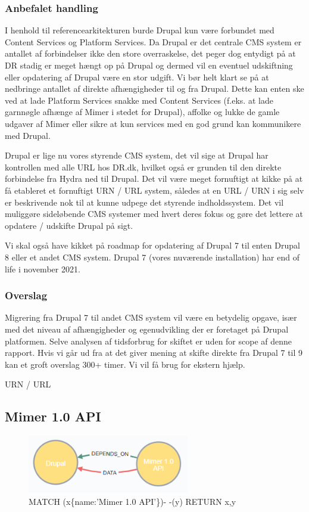 \documentclass{article}
\begin{document}
\subsubsection{Anbefalet handling}
I henhold til referencearkitekturen burde Drupal kun være forbundet med Content Services og Platform Services. Da Drupal er det centrale CMS system er antallet af forbindelser ikke den store overraskelse, det peger dog entydigt på at DR stadig er meget hængt op på Drupal og dermed vil en eventuel udskiftning eller opdatering af Drupal være en stor udgift.
Vi bør helt klart se på at nedbringe antallet af direkte afhængigheder til og fra Drupal. 
Dette kan enten ske ved at lade Platform Services snakke med Content Services (f.eks. at lade garnnøgle afhænge af Mimer i stedet for Drupal), affolke og lukke de gamle udgaver af Mimer eller sikre at kun services med en god grund kan kommunikere med Drupal.

Drupal er lige nu vores styrende CMS system, det vil sige at Drupal har kontrollen med alle URL hos DR.dk, hvilket også er grunden til den direkte forbindelse fra Hydra ned til Drupal. Det vil være meget fornuftigt at kikke på at få etableret et fornuftigt URN / URL system, således at en URL / URN i sig selv er beskrivende nok til at kunne udpege det styrende indholdssystem. Det vil muliggøre sideløbende CMS systemer med hvert deres fokus og gøre det lettere at opdatere / udskifte Drupal på sigt.
 
Vi skal også have kikket på roadmap for opdatering af Drupal 7 til enten Drupal 8 eller et andet CMS system. Drupal 7 (vores nuværende installation) har end of life i november 2021.
\subsubsection{Overslag}
Migrering fra Drupal 7 til andet CMS system vil være en betydelig opgave, især med det niveau af afhængigheder og egenudvikling der er foretaget på Drupal platformen. 
Selve analysen af tidsforbrug for skiftet er uden for scope af denne rapport. Hvis vi går ud fra at det giver mening at skifte direkte fra Drupal 7 til 9 kan et groft overslag 300+ timer. Vi vil få brug for ekstern hjælp.

URN / URL 


\subsection{Mimer 1.0 API}
\begin{figure}[h]
\includegraphics[width=200pt]{MimerAPI.PNG}
\caption{MATCH (x\{name:'Mimer 1.0 API'\})- -(y) RETURN x,y}
\end{figure}
\end{document}
